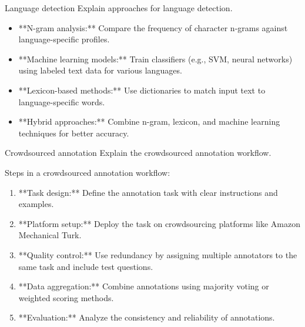 \documentclass{article}
\begin{document}
\begin{exercise}{Language detection}
  Explain approaches for language detection.

  \begin{solution}
    \begin{itemize}
        \item **N-gram analysis:** Compare the frequency of character n-grams against language-specific profiles.
        \item **Machine learning models:** Train classifiers (e.g., SVM, neural networks) using labeled text data for various languages.
        \item **Lexicon-based methods:** Use dictionaries to match input text to language-specific words.
        \item **Hybrid approaches:** Combine n-gram, lexicon, and machine learning techniques for better accuracy.
    \end{itemize}
  \end{solution}
\end{exercise}

\begin{exercise}{Crowdsourced annotation}
  Explain the crowdsourced annotation workflow.

  \begin{solution}
    Steps in a crowdsourced annotation workflow:
    \begin{enumerate}
        \item **Task design:** Define the annotation task with clear instructions and examples.
        \item **Platform setup:** Deploy the task on crowdsourcing platforms like Amazon Mechanical Turk.
        \item **Quality control:** Use redundancy by assigning multiple annotators to the same task and include test questions.
        \item **Data aggregation:** Combine annotations using majority voting or weighted scoring methods.
        \item **Evaluation:** Analyze the consistency and reliability of annotations.
    \end{enumerate}
  \end{solution}
\end{exercise}
\end{document}
